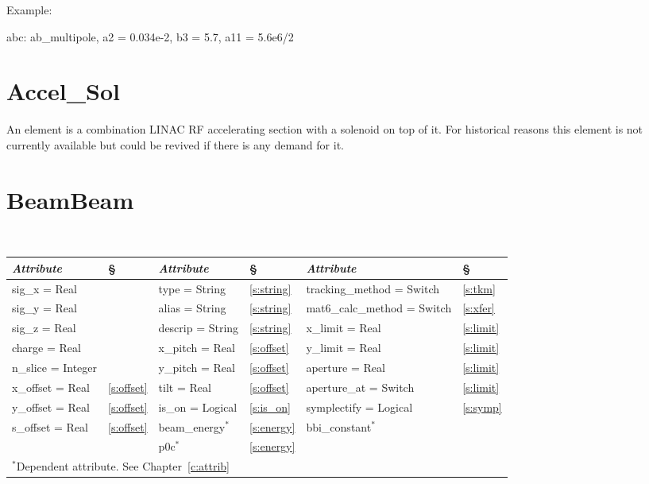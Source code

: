 Example:
\begin{example}
  abc: ab_multipole, a2 = 0.034e-2, b3 = 5.7, a11 = 5.6e6/2
\end{example}

\section{Accel\_Sol}
\label{s:accel_sol}

An  element is a combination LINAC RF accelerating
section with a solenoid on top of it. For historical reasons this
element is not currently available but could be revived if there is
any demand for it.

\section{BeamBeam}
\label{s:bbi}

\begin{center} 
\tt
\begin{tabular}{|l|l||l|l||l|l|} \hline
  {\sl Attribute} & \S  & {\sl Attribute} & \S & {\sl Attribute} & \S \\ \hline
  sig\_x   = Real       &                 & type = String    & \ref{s:string} & tracking\_method = Switch    & \ref{s:tkm}    \\ \hline
  sig\_y   = Real       &                 & alias = String   & \ref{s:string} & mat6\_calc\_method = Switch  & \ref{s:xfer}   \\ \hline
  sig\_z   = Real       &                 & descrip = String & \ref{s:string} & x\_limit    = Real           & \ref{s:limit}  \\ \hline
  charge   = Real       &                 & x\_pitch = Real  & \ref{s:offset} & y\_limit    = Real           & \ref{s:limit}  \\ \hline
  n\_slice = Integer    &                 & y\_pitch = Real  & \ref{s:offset} & aperture    = Real           & \ref{s:limit}  \\ \hline
  x\_offset = Real      & \ref{s:offset}  & tilt = Real      & \ref{s:offset} & aperture\_at = Switch        & \ref{s:limit}  \\ \hline
  y\_offset = Real      & \ref{s:offset}  & is\_on = Logical & \ref{s:is_on}  & symplectify = Logical        & \ref{s:symp}   \\ \hline
  s\_offset = Real      & \ref{s:offset}  & beam\_energy$^*$ & \ref{s:energy} & bbi\_constant$^*$            &                \\ \hline
                        &                 & p0c$^*$          & \ref{s:energy} &                              &                \\ \hline
  \multicolumn{6}{l}{\small $^*$Dependent attribute. See Chapter~\ref{c:attrib}} \\
\end{tabular}
\end{center}
\toffset

